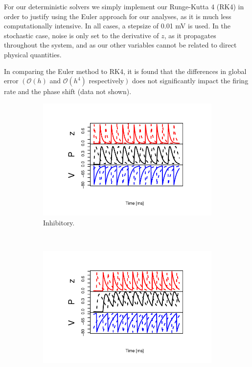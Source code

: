\documentclass[10pt]{article}
\theoremstyle{plain}
\begin{document}
\begin{multicols*}{2}
For our deterministic solvers we simply implement our Runge-Kutta 4 (RK4) in
order to justify using the Euler approach for our analyses, as it is much less
computationally intensive. In all cases, a stepsize of 0.01 mV is used. 
In the stochastic case, noise is only set to the derivative of $z$, as it
propagates throughout the system, and as our other variables cannot be related
to direct physical quantities.

In comparing the Euler method to RK4, it is found that the differences in global
error $\left( \mathcal{O}\left( h \right)\right.$ and $\mathcal{O}\left(
h^4 \right)$ respectively$\left.\right)$ does not
significantly impact the firing rate and the phase shift (data not shown).

\begin{figure}[H]
  \centering
  \begin{subfigure}[t]{.5\textwidth}
    \centering
    \includegraphics[trim={0 1.8cm 0 1.3cm}, clip, scale=.7]{inhib.pdf}
    \caption{Inhibitory.}
    \label{fig:inhib}
  \end{subfigure}\\
  \begin{subfigure}[t]{.5\textwidth}
    \centering
    \includegraphics[trim={0 1.8cm 0 1.cm}, clip, scale=.7]{excit.pdf}

\end{subfigure}
\end{figure}
\end{multicols*}
\end{document}
